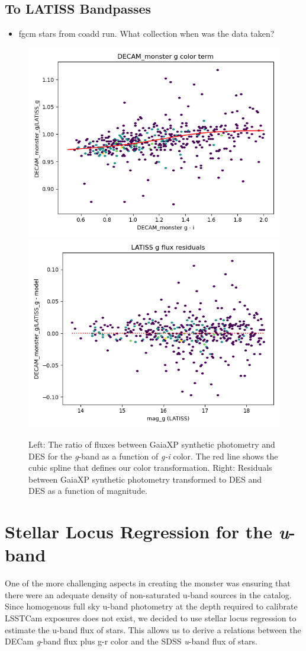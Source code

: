 \subsection{To LATISS Bandpasses}
\begin{itemize}
    \item fgcm stars from coadd run. What collection when was the data taken? 
\end{itemize}
\begin{figure}
    \includegraphics[width=0.49\linewidth]{./figures/color_terms/DECam_monster_to_LATISS_band_g_color_term.png}
    \includegraphics[width=0.49\linewidth]{./figures/color_terms/DECam_monster_to_LATISS_band_g_flux_residuals.png}
    \caption{Left: The ratio of fluxes between GaiaXP synthetic photometry and DES for the \textit{g}-band as a function of \textit{g-i} color. The red line shows the cubic spline that defines our color transformation.
    Right: Residuals between GaiaXP synthetic photometry transformed to DES and DES as a function of magnitude.}
    \label{fig:color-des-latiss-g}
\end{figure}

\section{Stellar Locus Regression for the \textit{u}-band}
\label{sec:slr}

One of the more challenging aspects in creating the monster was ensuring that there were an adequate density of non-saturated u-band sources in the catalog. 
Since homogenous full sky u-band photometry at the depth required to calibrate LSSTCam exposures does not exist, we decided to use stellar locus regression to estimate the u-band flux of stars.
This allows us to derive a relations between the DECam \textit{g}-band flux plus g-r color and the SDSS \textit{u}-band flux of stars. 

